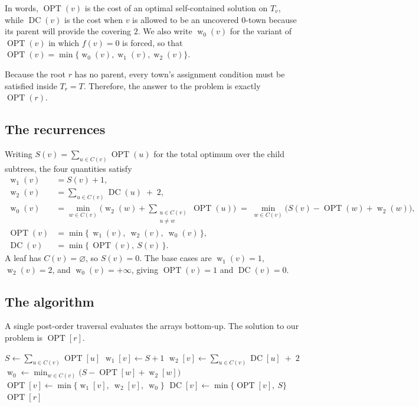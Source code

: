 \documentclass[11pt, a4paper]{article}
\newcommand{\OPT}{\operatorname{OPT}}
\newcommand{\DC}{\operatorname{DC}}
\newcommand{\with}[1]{\operatorname{w}_{#1}}  %
\newcommand{\Tv}{T_{v}}
\theoremstyle{plain}
\theoremstyle{definition}
\begin{document}
\noindent In words, $\OPT(v)$ is the cost of an optimal self-contained solution
on $\Tv$, while $\DC(v)$ is the cost when $v$ is allowed to be an uncovered
$0$-town because its parent will provide the covering $2$. We also write
$\with{0}(v)$ for the variant of $\OPT(v)$ in which $f(v) = 0$ is forced, so that
$\OPT(v) = \min\{\with{0}(v), \with{1}(v), \with{2}(v)\}$.

Because the root $r$ has no parent, every town's assignment condition must be
satisfied inside $T_r = T$. Therefore, the answer to the problem is exactly
$\OPT(r)$.

\subsection{The recurrences}

Writing $S(v) = \sum_{u \in C(v)} \OPT(u)$ for the total optimum over the child
subtrees, the four quantities satisfy
\begin{align}
    \with{1}(v) &= S(v) + 1, \label{eq:w1}\\
    \with{2}(v) &= \sum_{u \in C(v)} \DC(u) \;+\; 2, \label{eq:w2}\\
    \with{0}(v) &= \min_{w \in C(v)} \Big( \with{2}(w) + \!\!\sum_{\substack{u \in C(v)\\ u \neq w}}\!\! \OPT(u) \Big)
                 \;=\; \min_{w \in C(v)} \big( S(v) - \OPT(w) + \with{2}(w) \big), \label{eq:w0}\\
    \OPT(v)     &= \min\big\{\, \with{1}(v),\ \with{2}(v),\ \with{0}(v) \,\big\}, \label{eq:opt}\\
    \DC(v)      &= \min\big\{\, \OPT(v),\ S(v) \,\big\}. \label{eq:dc}
\end{align}
A leaf has $C(v) = \varnothing$, so $S(v) = 0$. The base cases are
$\with{1}(v) = 1$, $\with{2}(v) = 2$, and $\with{0}(v) = +\infty$, giving
$\OPT(v) = 1$ and $\DC(v) = 0$.

\subsection{The algorithm}

A single post-order traversal evaluates the arrays bottom-up. The solution to our
problem is $\OPT[r]$.

\begin{algorithm}[ht]
\caption{Minimum troupe assignment on a tree}
\begin{algorithmic}
        \State $S \gets \sum_{u \in C(v)} \OPT[u]$
        \State $\with{1}[v] \gets S + 1$
        \State $\with{2}[v] \gets \sum_{u \in C(v)} \DC[u] \;+\; 2$
        \State $\with{0} \gets \min_{w \in C(v)} \big( S - \OPT[w] + \with{2}[w] \big)$ 
        \State $\OPT[v] \gets \min\{\with{1}[v],\ \with{2}[v],\ \with{0}\}$
        \State $\DC[v] \gets \min\{\OPT[v],\ S\}$
    \EndFor
    \State \Return $\OPT[r]$
\EndFunction
\end{algorithmic}
\end{algorithm}
\end{document}
